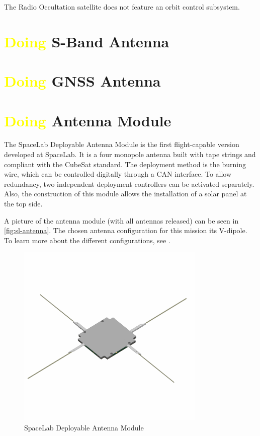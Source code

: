 The Radio Occultation satellite does not feature an orbit control subsystem.


\section{ \textcolor{yellow}{Doing} S-Band Antenna}

\section{ \textcolor{yellow}{Doing} GNSS Antenna}

\section{ \textcolor{yellow}{Doing} Antenna Module}

The SpaceLab Deployable Antenna Module is the first flight-capable version developed at SpaceLab. It is a four monopole antenna built with tape strings and compliant with the CubeSat standard. The deployment method is the burning wire, which can be controlled digitally through a CAN interface. To allow redundancy, two independent deployment controllers can be activated separately. Also, the construction of this module allows the installation of a solar panel at the top side.

A picture of the antenna module (with all antennas released) can be seen in \autoref{fig:sl-antenna}. The chosen antenna configuration for this mission its V-dipole. To learn more about the different configurations, see \cite{ant-rad}.

\begin{figure}[!ht]
    \begin{center}
        \includegraphics[width=0.8\textwidth]{figures/subsystems/sl-antenna.png}
        \caption{SpaceLab Deployable Antenna Module}
        \label{fig:sl-antenna}
    \end{center}
\end{figure}


